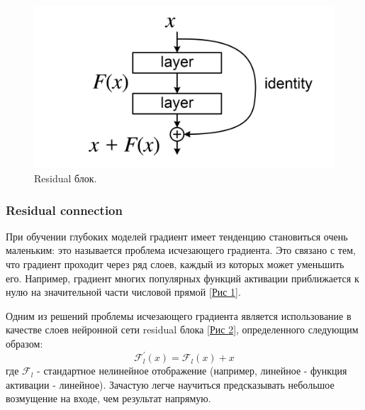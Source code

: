 \newpage

\begin{figure}
    \centering
    \includegraphics[scale=1]{./images/ResBlock.png}
    \caption{\protect\hypertarget{image2}{Residual блок.}}
\end{figure}

\subsubsection{Residual connection}
При обучении глубоких моделей градиент имеет тенденцию становиться очень маленьким: это называется проблема исчезающего градиента. Это связано с тем, что градиент проходит через ряд слоев, каждый из которых может уменьшить его. Например, градиент многих популярных функций активации приближается к нулю на значительной части числовой прямой \hyperlink{image1}{[Рис 1]}. 

Одним из решений проблемы исчезающего градиента является использование в качестве слоев нейронной сети residual блока \hyperlink{image2 }{[Рис 2]}, определенного следующим образом:
\begin{equation}
	\mathcal{F}_{l}^{'}(x) = \mathcal{F}_{l}(x) + x
\end{equation}
где $\mathcal{F}_{l}$ - стандартное нелинейное отображение (например, линейное - функция активации - линейное). Зачастую легче научиться предсказывать небольшое возмущение на входе, чем результат напрямую.

